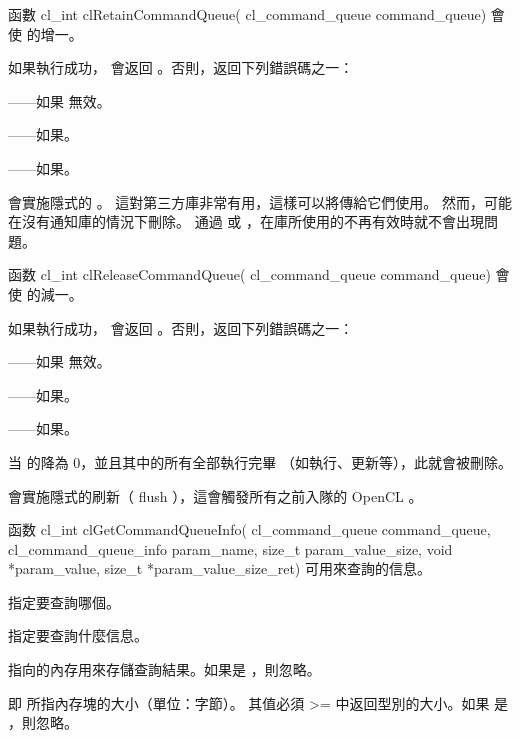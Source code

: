 函數
\startclc
cl_int clRetainCommandQueue(
		cl_command_queue command_queue)
\stopclc
會使  的增一。

如果執行成功， 會返回 。否則，返回下列錯誤碼之一：
\startigBase
\item {}——如果  無效。
\item {}——如果\scdevfailres。
\item {}——如果\schostfailres。
\stopigBase

 會實施隱式的 。
這對第三方庫非常有用，這樣可以將傳給它們使用。
然而，可能在沒有通知庫的情況下刪除。
通過  或  ，在庫所使用的不再有效時就不會出現問題。

函数
\startclc
cl_int clReleaseCommandQueue(
		cl_command_queue command_queue)
\stopclc
會使  的減一。

如果執行成功， 會返回 。否則，返回下列錯誤碼之一：
\startigBase
\item {}——如果  無效。
\item {}——如果\scdevfailres。
\item {}——如果\schostfailres。
\stopigBase

当  的降為 0，並且其中的所有全部執行完畢
（如執行、更新等），此就會被刪除。

會實施隱式的刷新（ flush ），這會觸發所有之前入隊的 OpenCL 。

函数
\startclc
cl_int clGetCommandQueueInfo(
		cl_command_queue command_queue,
		cl_command_queue_info param_name,
		size_t param_value_size,
		void *param_value,
		size_t *param_value_size_ret)
\stopclc
可用來查詢的信息。

 指定要查詢哪個。

 指定要查詢什麼信息。

 指向的內存用來存儲查詢結果。如果是 ，則忽略。

 即  所指內存塊的大小（單位：字節）。
其值必須 >= 中返回型別的大小。如果  是 ，則忽略。

